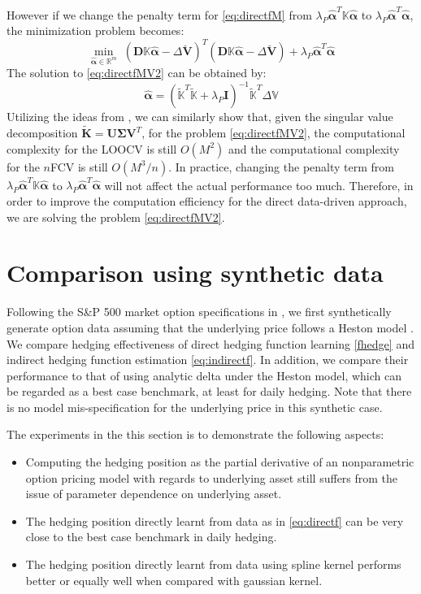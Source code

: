 \documentclass[letterpaper,12pt,titlepage,oneside,final]{book}
\numberwithin{equation}{section}
\theoremstyle{definition}
\newcommand{\Real}{\mathbb{R}}
\newcommand{\valpha}{\pmb{\widehat{\alpha}}}
\newcommand{\vK}{\mathbb{K}}
\newcommand{\vV}{\pmb{\breve{V}}}
\newcommand{\vecVmkt}{\mathbb{V}}
\begin{document}
However if we change the penalty term for \eqref{eq:directfM} from $\lambda_P \valpha^T\vK\valpha$ to $\lambda_P \valpha^T\valpha$, the minimization problem becomes:
\begin{equation}
\min_{\valpha \in \Real^m} \; ( \pmb{D} \vK \valpha - \Delta\vV)^T (\pmb{D}  \vK \valpha -\Delta\vV)+ \lambda_P \valpha^T\valpha
\label{eq:directfMV2}
\end{equation}
The solution to \eqref{eq:directfMV2} can be obtained by:
\[
\valpha = (\widetilde{\vK}^T\widetilde{\vK}  + \lambda_P \pmb{I})^{-1} \widetilde{\vK}^T \Delta \vecVmkt
\]
Utilizing the ideas from \cite{pahikkala2006fast, wahba1990spline}, we can similarly show that,  given the singular value decomposition $\pmb{\widetilde{K}}=\pmb{U} \pmb{\Sigma} \pmb{V}^T$, for the problem \eqref{eq:directfMV2},  the computational complexity for the LOOCV is still $O(M^2)$ and the computational complexity for the $n$FCV is still $O(M^3/n)$. In practice, changing the penalty term from $\lambda_P \valpha^T\vK\valpha$ to $\lambda_P \valpha^T\valpha$ will not affect the actual performance too much. Therefore, in order to improve the computation efficiency for the direct data-driven approach, we are solving the problem \eqref{eq:directfMV2}.






\section{Comparison using synthetic data}\label{sec:Synexperiment}
Following the S\&P 500  market option specifications in \citep{hull2006options},  we first synthetically generate option data assuming that the underlying price follows a Heston model \citep{heston1993closed}.
We  compare hedging effectiveness of direct hedging function learning \eqref{fhedge}  and indirect hedging function estimation  \eqref{eq:indirectf}. In addition, we compare their performance to that of using  analytic delta under the  Heston model, which can be regarded as a best case benchmark, at least for daily hedging. Note that there is no model mis-specification  for the underlying price in this synthetic case.

The experiments in the this section is to demonstrate the following aspects:
\begin{itemize}
\item Computing the hedging position as the partial derivative of an nonparametric option pricing model with regards to underlying asset still suffers from the issue of parameter dependence on underlying asset.
\item The hedging position directly learnt from data as in \eqref{eq:directf} can be very close to the  best case benchmark in daily hedging.
\item The hedging position directly learnt from data using spline kernel performs better or equally well when compared with gaussian kernel.
\end{itemize}
\end{document}
